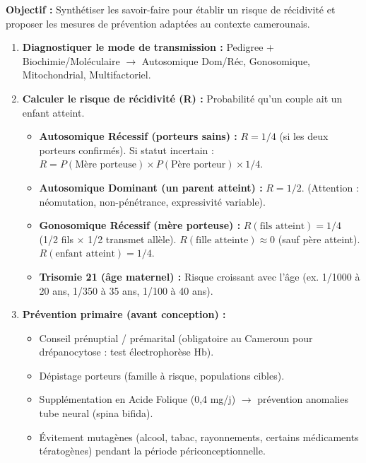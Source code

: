 \documentclass[11pt]{article}
\begin{document}
\begin{methode}
    \textbf{Objectif :} Synthétiser les savoir-faire pour établir un risque de récidivité et proposer les mesures de prévention adaptées au contexte camerounais.
    \begin{enumerate}
        \item \textbf{Diagnostiquer le mode de transmission :} Pedigree + Biochimie/Moléculaire $\to$ Autosomique Dom/Réc, Gonosomique, Mitochondrial, Multifactoriel.
        \item \textbf{Calculer le risque de récidivité (R) :} Probabilité qu'un couple ait un enfant atteint.
            \begin{itemize}
                \item \textbf{Autosomique Récessif (porteurs sains) :} $R = 1/4$ (si les deux porteurs confirmés). Si statut incertain : $R = P(\text{Mère porteuse}) \times P(\text{Père porteur}) \times 1/4$.
                \item \textbf{Autosomique Dominant (un parent atteint) :} $R = 1/2$. (Attention : néomutation, non-pénétrance, expressivité variable).
                \item \textbf{Gonosomique Récessif (mère porteuse) :} $R(\text{fils atteint}) = 1/4$ (1/2 fils $\times$ 1/2 transmet allèle). $R(\text{fille atteinte}) \approx 0$ (sauf père atteint). $R(\text{enfant atteint}) = 1/4$.
                \item \textbf{Trisomie 21 (âge maternel) :} Risque croissant avec l'âge (ex. 1/1000 à 20 ans, 1/350 à 35 ans, 1/100 à 40 ans).
            \end{itemize}
        \item \textbf{Prévention primaire (avant conception) :}
            \begin{itemize}
                \item Conseil prénuptial / prémarital (obligatoire au Cameroun pour drépanocytose : test électrophorèse Hb).
                \item Dépistage porteurs (famille à risque, populations cibles).
                \item Supplémentation en Acide Folique (0,4 mg/j) $\to$ prévention anomalies tube neural (spina bifida).
                \item Évitement mutagènes (alcool, tabac, rayonnements, certains médicaments tératogènes) pendant la période périconceptionnelle.
            \end{itemize}

\end{enumerate}
\end{methode}
\end{document}
